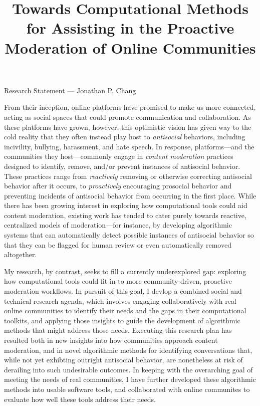 \documentclass[11pt,letterpaper]{article}
\title{Towards Computational Methods for Assisting in the Proactive Moderation of Online Communities}
\begin{document}
\maketitle

\begin{center}
Research Statement --- Jonathan P. Chang
\end{center}

From their inception, online platforms have promised to make us more connected, acting as social spaces that could promote communication and collaboration. 
As these platforms have grown, however, this optimistic vision has given way to the cold reality that they often instead play host to \emph{antisocial} behaviors, including incivility, bullying, harassment, and hate speech. 
In response, platforms---and the communities they host---commonly engage in \emph{content moderation} practices designed to identify, remove, and/or prevent instances of antisocial behavior.
These practices range from \emph{reactively} removing or otherwise correcting antisocial behavior after it occurs, to \emph{proactively} encouraging prosocial behavior and preventing incidents of antisocial behavior from occurring in the first place.
While there has been growing interest in exploring how computational tools could aid content moderation, existing work has tended to cater purely towards reactive, centralized models of moderation---for instance, by developing algorithmic systems that can automatically detect possible instances of antisocial behavior so that they can be flagged for human review or even automatically removed altogether.

My research, by contrast, seeks to fill a currently underexplored gap: exploring how computational tools could fit in to more community-driven, proactive moderation workflows.
In pursuit of this goal, I devlop a combined social and technical research agenda, which involves engaging collaboratively with real online communities to identify their needs and the gaps in their computational toolkits, and applying those insights to guide the development of algorithmic methods that might address those needs.
Executing this research plan has resulted both in new insights into how communities approach content moderation, and in novel algorithmic methods for identifying conversations that, while not yet exhibting outright antisocial behavior, are nonetheless at risk of derailing into such undesirable outcomes.
In keeping with the overarching goal of meeting the needs of real communities, I have further developed these algorithmic methods into usable software tools, and collaborated with online communites to evaluate how well these tools address their needs.
\end{document}
